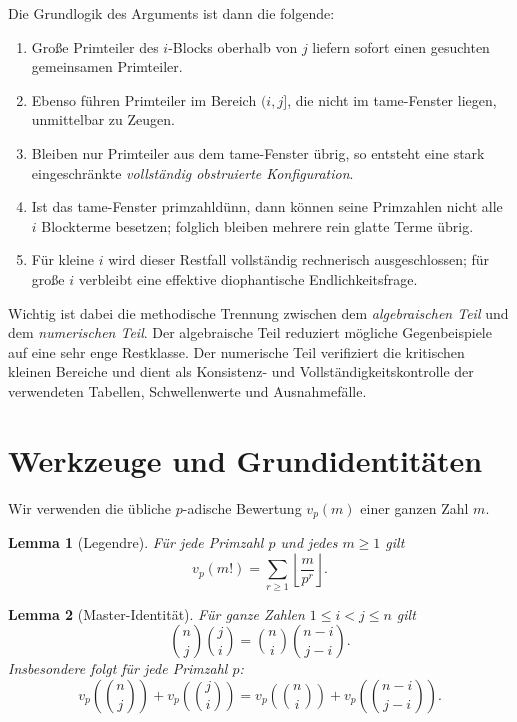 \documentclass[12pt,a4paper]{article}
\theoremstyle{plain}
\newtheorem{lemma}{Lemma}
\theoremstyle{definition}
\theoremstyle{remark}
\newcommand{\vp}{v_p}
\begin{document}
	Die Grundlogik des Arguments ist dann die folgende:
	
	\begin{enumerate}[label=\arabic*.]
		\item Große Primteiler des $i$-Blocks oberhalb von $j$ liefern sofort einen gesuchten gemeinsamen Primteiler.
		\item Ebenso führen Primteiler im Bereich $(i,j]$, die nicht im tame-Fenster liegen, unmittelbar zu Zeugen.
		\item Bleiben nur Primteiler aus dem tame-Fenster übrig, so entsteht eine stark eingeschränkte \emph{vollständig obstruierte Konfiguration}.
		\item Ist das tame-Fenster primzahldünn, dann können seine Primzahlen nicht alle $i$ Blockterme besetzen; folglich bleiben mehrere rein glatte Terme übrig.
		\item Für kleine $i$ wird dieser Restfall vollständig rechnerisch ausgeschlossen; für große $i$ verbleibt eine effektive diophantische Endlichkeitsfrage.
	\end{enumerate}
	
	Wichtig ist dabei die methodische Trennung zwischen dem \emph{algebraischen Teil} und dem \emph{numerischen Teil}. 
	Der algebraische Teil reduziert mögliche Gegenbeispiele auf eine sehr enge Restklasse. 
	Der numerische Teil verifiziert die kritischen kleinen Bereiche und dient als Konsistenz- und Vollständigkeitskontrolle der verwendeten Tabellen, Schwellenwerte und Ausnahmefälle.
	
	\section{Werkzeuge und Grundidentitäten}
	
	Wir verwenden die übliche $p$-adische Bewertung $\vp(m)$ einer ganzen Zahl $m$.
	
	\begin{lemma}[Legendre]
		Für jede Primzahl $p$ und jedes $m\ge 1$ gilt
		\[
		v_p(m!)=\sum_{r\ge1}\left\lfloor \frac{m}{p^r}\right\rfloor.
		\]
	\end{lemma}
	
	\begin{lemma}[Master-Identität]
		Für ganze Zahlen $1 \le i < j \le n$ gilt
		\begin{equation}\label{eq:master}
			\binom{n}{j}\binom{j}{i}
			=
			\binom{n}{i}\binom{n-i}{j-i}.
		\end{equation}
		Insbesondere folgt für jede Primzahl $p$:
		\[
		\vp\!\left(\binom{n}{j}\right)+\vp\!\left(\binom{j}{i}\right)
		=
		\vp\!\left(\binom{n}{i}\right)+\vp\!\left(\binom{n-i}{j-i}\right).
		\]
	\end{lemma}
	
\end{document}
